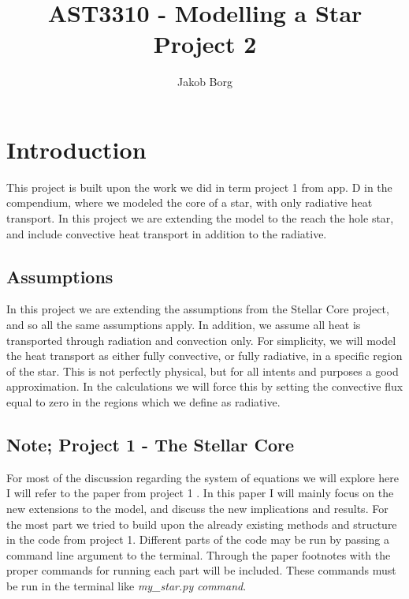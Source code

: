 \documentclass[11pt,a4paper,twocolumn,titlepage]{article}
\title{AST3310 - Modelling a Star\\ 
\vspace{15mm}Project 2}
\author{Jakob Borg}
\begin{document}
\maketitle

\section{Introduction}\label{sec:Intro}
This project is built upon the work we did in term project 1 from app. D in the compendium, where we modeled the core of a star, with only radiative heat transport. In this project we are extending the model to the reach the hole star, and include convective heat transport in addition to the radiative.

\subsection{Assumptions}\label{subsec:Intro/Assumptions}
In this project we are extending the assumptions from the Stellar Core project, and so all the same assumptions apply. In addition, we assume all heat is transported through radiation and convection only. For simplicity, we will model the heat transport as either fully convective, or fully radiative, in a specific region of the star. This is not perfectly physical, but for all intents and purposes a good approximation. In the calculations we will force this by setting the convective flux equal to zero in the regions which we define as radiative.

\subsection{Note; Project 1 - The Stellar Core} \label{subsec:Intro/project1}
For most of the discussion regarding the system of equations we will explore here I will refer to the paper from project 1 \citep{Project1}. In this paper I will mainly focus on the new extensions to the model, and discuss the new implications and results. For the most part we tried to build upon the already existing methods and structure in the code from project 1. Different parts of the code may be run by passing a command line argument to the terminal. Through the paper footnotes with the proper commands for running each part will be included. These commands must be run in the terminal like \textit{my\_star.py command}.
\end{document}
